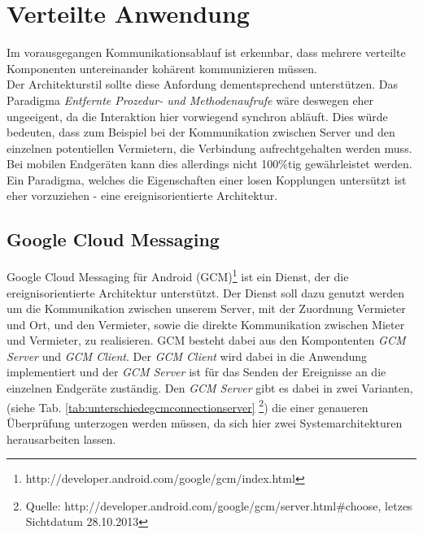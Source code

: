 
\section{Verteilte Anwendung}
Im vorausgegangen Kommunikationsablauf ist erkennbar, dass mehrere verteilte Komponenten untereinander kohärent kommunizieren müssen.\\

Der Architekturstil sollte diese Anfordung dementsprechend unterstützen. Das Paradigma \textit{Entfernte Prozedur- und Methodenaufrufe} wäre deswegen eher ungeeigent, da die Interaktion hier vorwiegend synchron abläuft. Dies würde bedeuten, dass zum Beispiel bei der Kommunikation zwischen Server und den einzelnen potentiellen Vermietern, die Verbindung aufrechtgehalten werden muss. Bei mobilen Endgeräten kann dies allerdings nicht 100\%tig gewährleistet werden.
Ein Paradigma, welches die Eigenschaften einer losen Kopplungen untersützt ist eher vorzuziehen - eine ereignisorientierte Architektur.\\



\subsection{Google Cloud Messaging}

Google Cloud Messaging für Android (GCM)\footnote{http://developer.android.com/google/gcm/index.html} ist ein Dienst, der die ereignisorientierte Architektur unterstützt.
Der Dienst soll dazu genutzt werden um die Kommunikation zwischen unserem Server, mit der Zuordnung Vermieter und Ort, und den Vermieter, sowie die direkte Kommunikation zwischen Mieter und Vermieter, zu realisieren.
GCM besteht dabei aus den Kompontenten \textit{GCM Server} und \textit{GCM Client}.
Der \textit{GCM Client} wird dabei in die Anwendung implementiert und der \textit{GCM Server} ist für das Senden der Ereignisse an die einzelnen Endgeräte zuständig. Den \textit{GCM Server} gibt es dabei in zwei Varianten, (siehe Tab. \ref{tab:unterschiedegcmconnectionserver} \footnote{Quelle: http://developer.android.com/google/gcm/server.html\#choose, letzes Sichtdatum 28.10.2013}) die einer genaueren Überprüfung unterzogen werden müssen, da sich hier zwei Systemarchitekturen herausarbeiten lassen.

